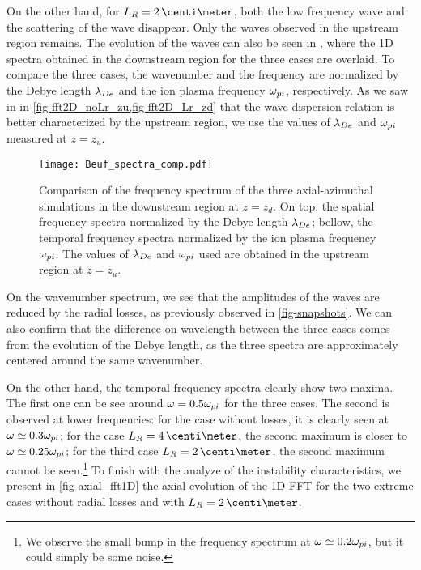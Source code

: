On the other hand, for $L_R=2\,\centi\meter$, both the low frequency wave and the scattering of the wave disappear.
Only the waves observed in the upstream region remains.
The evolution of the waves can also be seen in , where the \ac{1D} spectra obtained in the downstream region for the three cases are overlaid.
To compare the three cases, the wavenumber and the frequency are normalized by the Debye length $\lambda_{De}$ and the ion plasma frequency $\omega_{pi}$, respectively.
As we saw in in \cref{fig-fft2D_noLr_zu,fig-fft2D_Lr_zd} that the wave dispersion relation is better characterized by the upstream region, we use the values of $\lambda_{De}$ and $\omega_{pi}$ measured at $z=z_u$.


\begin{figure}[hbtp]
  \centering
  \texttt{[image: Beuf\_spectra\_comp.pdf]}
  \caption{Comparison of the frequency spectrum of the three axial-azimuthal simulations in the downstream region at $z=z_d$. On top, the spatial frequency spectra normalized by the Debye length $\lambda_{De}$\string; bellow, the temporal frequency spectra normalized by the ion plasma frequency $\omega_{pi}$. The values of $\lambda_{De}$ and $\omega_{pi}$ used are obtained in the upstream region at $z=z_u$.}
  \label{fig-boeuf_fft_comparasion}
\end{figure}


On the wavenumber spectrum, we see that the amplitudes of the waves are reduced by the radial losses, as previously observed in \cref{fig-snapshots}.
We can also confirm that the difference on wavelength between the three cases comes from the evolution of the Debye length, as the three spectra are approximately centered around the same wavenumber.

On the other hand, the temporal frequency spectra clearly show two maxima. 
The first one can be see around $\omega = 0.5 \omega_{pi}$ for the three cases.
The second is observed at lower frequencies\string: for the case without losses, it is clearly seen at  $\omega \simeq 0.3 \omega_{pi}$\string; for the case $L_R=4\,\centi\meter$, the second maximum is closer to $\omega \simeq 0.25 \omega_{pi}$\string; for the third case $L_R=2\,\centi\meter$, the second maximum cannot be seen.\footnote{We observe the small bump in the frequency spectrum at $\omega \simeq 0.2 \omega_{pi}$, but it could simply be some noise. }
To finish with the analyze of the instability characteristics, we present in \cref{fig-axial_fft1D} the axial evolution of the \ac{1D} \ac{FFT} for the two extreme cases without radial losses and with $L_R=2\,\centi\meter$.
 
